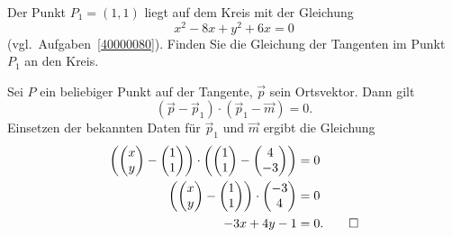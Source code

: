Der Punkt $P_1=(1,1)$ liegt auf dem Kreis mit der Gleichung
\[
x^2-8x+y^2+6x=0
\]
(vgl.~Aufgaben~\ref{40000080}).
Finden Sie die Gleichung der Tangenten im Punkt $P_1$ an den Kreis.

\begin{loesung}
Sei $P$ ein beliebiger Punkt auf der Tangente, $\vec{p}$ sein Ortsvektor.
Dann gilt
\[
(\vec{p}-\vec{p}_1)\cdot (\vec{p}_1-\vec{m}) = 0.
\]
Einsetzen der bekannten Daten für $\vec{p}_1$ und $\vec{m}$ ergibt
die Gleichung
\begin{align*}
\biggl(
\biggl(
\begin{matrix}x\\y\end{matrix}
\biggr)
-
\biggl(
\begin{matrix}1\\1\end{matrix}
\biggr)
\biggr)
\cdot
\biggl(
\biggl(
\begin{matrix}1\\1\end{matrix}
\biggr)
-
\biggl(
\begin{matrix}4\\-3\end{matrix}
\biggr)
\biggr)
&=
0
\\
\biggl(
\biggl(
\begin{matrix}x\\y\end{matrix}
\biggr)
-
\biggl(
\begin{matrix}1\\1\end{matrix}
\biggr)
\biggr)
\cdot
\biggl(
\begin{matrix}-3\\4\end{matrix}
\biggr)
&=
0
\\
-3x+4y-1
&=0.
\qedhere
\end{align*}
\end{loesung}

